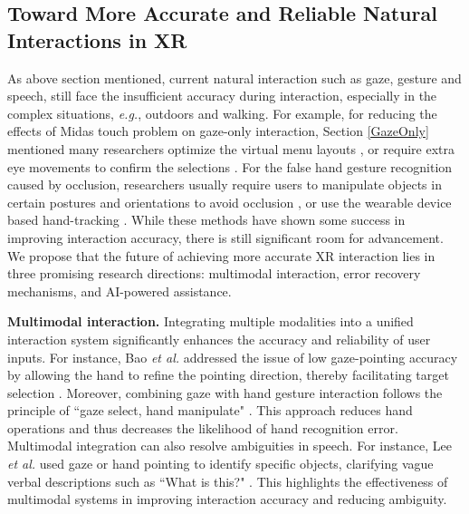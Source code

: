 \documentclass[review]{fcs}
\begin{document}
\subsection{Toward More Accurate and Reliable Natural Interactions in XR}
\label{4.1}
As above section mentioned, current natural interaction such as gaze, gesture and speech, still face the insufficient accuracy during interaction, especially in the complex situations, \textit{e.g.}, outdoors and walking. 
For example, for reducing the effects of Midas touch problem on gaze-only interaction, Section \ref{GazeOnly} mentioned many researchers optimize the virtual menu layouts \cite{DBLP:conf/chi/ChoiSO22, DBLP:conf/vr/0001LC00S22}, or require extra eye movements to confirm the selections \cite{DBLP:conf/vr/OrloskyLSSM24, kim2022lattice}. For the false hand gesture recognition caused by occlusion, researchers usually require users to manipulate objects in certain postures and orientations to avoid occlusion \cite{DBLP:conf/chi/PeiCLZ22, DBLP:journals/tvcg/SongDK23}, or use the wearable device based hand-tracking \cite{DBLP:conf/chi/HeLP22}.
While these methods have shown some success in improving interaction accuracy, there is still significant room for advancement. We propose that the future of achieving more accurate XR interaction lies in three promising research directions: multimodal interaction, error recovery mechanisms, and AI-powered assistance.

\textbf{Multimodal interaction.} Integrating multiple modalities into a unified interaction system significantly enhances the accuracy and reliability of user inputs. For instance, Bao \textit{et al.} addressed the issue of low gaze-pointing accuracy by allowing the hand to refine the pointing direction, thereby facilitating target selection \cite{10108465}. Moreover, combining gaze with hand gesture interaction follows the principle of ``gaze select, hand manipulate" \cite{10.1145/3544548.3581423, 10.1145/3530886}. This approach reduces hand operations and thus decreases the likelihood of hand recognition error.
Multimodal integration can also resolve ambiguities in speech. For instance, Lee \textit{et al.} used gaze or hand pointing to identify specific objects, clarifying vague verbal descriptions such as ``What is this?" \cite{DBLP:conf/chi/0005WBCRF24}.
This highlights the effectiveness of multimodal systems in improving interaction accuracy and reducing ambiguity.
\end{document}
